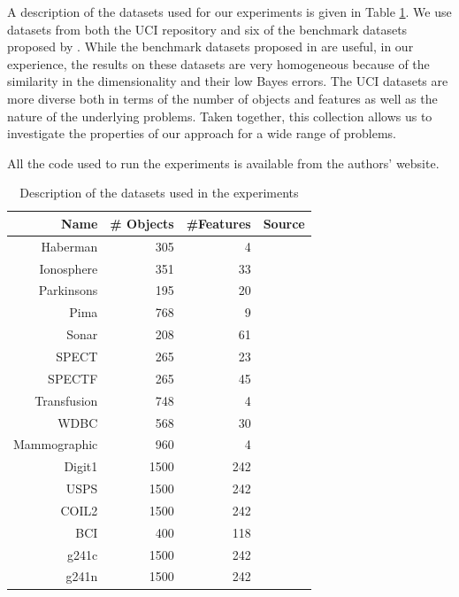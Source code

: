 \documentclass[smallcondensed]{svjour3}
\begin{document}
A description of the datasets used for our experiments is given in Table \ref{table:datasets}. We use datasets from both the UCI repository \cite{Bache2013} and six of the benchmark datasets proposed by \cite{Chapelle2006}. While the benchmark datasets proposed in \cite{Chapelle2006} are useful, in our experience, the results on these datasets are very homogeneous because of the similarity in the dimensionality and their low Bayes errors. The UCI datasets are more diverse both in terms of the number of objects and features as well as the nature of the underlying problems. Taken together, this collection allows us to investigate the properties of our approach for a wide range of problems.

All the code used to run the experiments is available from the authors' website.

\begin{table}[ht] 
\caption{Description of the datasets used in the experiments}
\begin{center}
\begin{tabular}{rrrr}
  \hline
 Name & \# Objects & \#Features & Source \\ 
  \hline
  Haberman & 305 &   4 & \cite{Bache2013} \\ 
  Ionosphere & 351 &  33 & \cite{Bache2013} \\ 
  Parkinsons & 195 &  20 & \cite{Bache2013} \\ 
  Pima & 768 &   9 & \cite{Bache2013} \\ 
  Sonar & 208 &  61 & \cite{Bache2013} \\ 
  SPECT & 265 &  23 & \cite{Bache2013} \\ 
  SPECTF & 265 &  45 & \cite{Bache2013} \\ 
  Transfusion & 748 &   4 & \cite{Bache2013} \\ 
  WDBC & 568 &  30 & \cite{Bache2013} \\
  Mammographic & 960 & 4 & \cite{Bache2013} \\
  Digit1 & 1500 & 242 & \cite{Chapelle2006} \\ 
  USPS & 1500 & 242 & \cite{Chapelle2006}  \\ 
  COIL2 & 1500 & 242 & \cite{Chapelle2006} \\ 
  BCI & 400 & 118 & \cite{Chapelle2006} \\ 
  g241c & 1500 & 242 & \cite{Chapelle2006} \\ 
  g241n & 1500 & 242 & \cite{Chapelle2006} \\ 
   \hline
\end{tabular}
\end{center}

\label{table:datasets}
\end{table}
\end{document}
